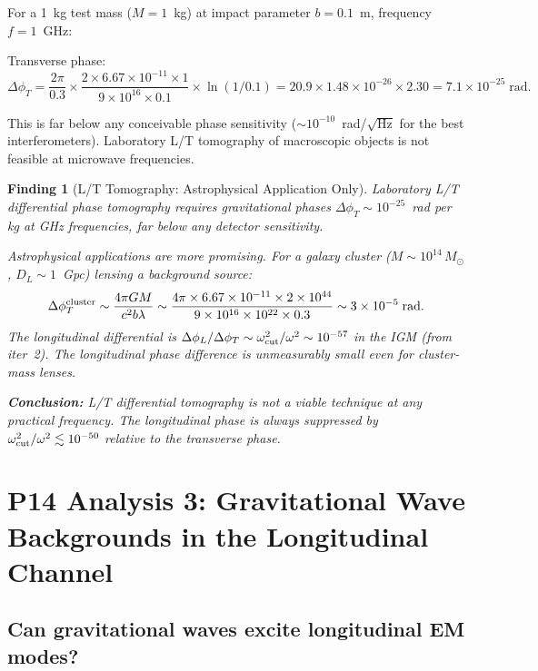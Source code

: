 \documentclass[11pt]{article}
\newtheorem{finding}{Finding}
\newcommand{\ee}[1]{\times 10^{#1}}
\begin{document}
For a 1~kg test mass ($M = 1$~kg) at impact parameter $b = 0.1$~m,
frequency $f = 1$~GHz:

Transverse phase:
\begin{equation}
\Delta\phi_T = \frac{2\pi}{0.3} \times \frac{2 \times 6.67\ee{-11}
\times 1}{9\ee{16} \times 0.1} \times \ln(1/0.1)
= 20.9 \times 1.48\ee{-26} \times 2.30 = 7.1\ee{-25}\;\text{rad}.
\end{equation}

This is far below any conceivable phase sensitivity
($\sim 10^{-10}$~rad/$\sqrt{\text{Hz}}$ for the best
interferometers). Laboratory L/T tomography of macroscopic objects
is not feasible at microwave frequencies.

\begin{finding}[L/T Tomography: Astrophysical Application Only]
\label{find:tomo-astro}
Laboratory L/T differential phase tomography requires gravitational
phases $\Delta\phi_T \sim 10^{-25}$~rad per kg at GHz frequencies,
far below any detector sensitivity.

Astrophysical applications are more promising. For a galaxy cluster
($M \sim 10^{14}\,M_\odot$, $D_L \sim 1$~Gpc) lensing a background
source:
\begin{equation}
\Delta\phi_T^{\rm cluster} \sim \frac{4\pi GM}{c^2 b\lambda}
\sim \frac{4\pi \times 6.67\ee{-11} \times 2\ee{44}}
{9\ee{16} \times 10^{22} \times 0.3}
\sim 3\ee{-5}\;\text{rad}.
\end{equation}
The longitudinal differential is $\Delta\phi_L/\Delta\phi_T
\sim \omega_{\rm cut}^2/\omega^2 \sim 10^{-57}$ in the IGM
(from iter~2). The longitudinal phase difference is
\textit{unmeasurably small} even for cluster-mass lenses.

\textbf{Conclusion:} L/T differential tomography is not a viable
technique at any practical frequency. The longitudinal phase is
always suppressed by $\omega_{\rm cut}^2/\omega^2 \lesssim 10^{-50}$
relative to the transverse phase.
\end{finding}

\section{P14 Analysis 3: Gravitational Wave Backgrounds in the
Longitudinal Channel}
\label{sec:gw-background}

\subsection{Can gravitational waves excite longitudinal EM modes?}
\end{document}
